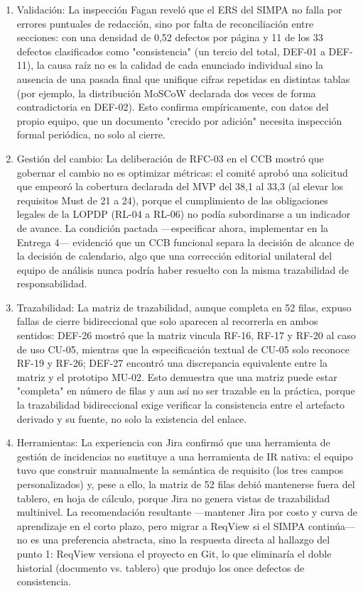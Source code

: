 \documentclass[11pt,letterpaper]{article}
\begin{document}
\begin{enumerate}[leftmargin=*]
  \item {Validación: La inspección Fagan reveló que el ERS del SIMPA no falla por errores puntuales de redacción, sino por falta de reconciliación entre secciones: con una densidad de 0,52 defectos por página y 11 de los 33 defectos clasificados como "consistencia" (un tercio del total, DEF-01 a DEF-11), la causa raíz no es la calidad de cada enunciado individual sino la ausencia de una pasada final que unifique cifras repetidas en distintas tablas (por ejemplo, la distribución MoSCoW declarada dos veces de forma contradictoria en DEF-02). Esto confirma empíricamente, con datos del propio equipo, que un documento "crecido por adición" necesita inspección formal periódica, no solo al cierre.}
  \item {Gestión del cambio: La deliberación de RFC-03 en el CCB mostró que gobernar el cambio no es optimizar métricas: el comité aprobó una solicitud que empeoró la cobertura declarada del MVP del 38,1 al 33,3 (al elevar los requisitos Must de 21 a 24), porque el cumplimiento de las obligaciones legales de la LOPDP (RL-04 a RL-06) no podía subordinarse a un indicador de avance. La condición pactada —especificar ahora, implementar en la Entrega 4— evidenció que un CCB funcional separa la decisión de alcance de la decisión de calendario, algo que una corrección editorial unilateral del equipo de análisis nunca podría haber resuelto con la misma trazabilidad de responsabilidad.}
  \item {Trazabilidad: La matriz de trazabilidad, aunque completa en 52 filas, expuso fallas de cierre bidireccional que solo aparecen al recorrerla en ambos sentidos: DEF-26 mostró que la matriz vincula RF-16, RF-17 y RF-20 al caso de uso CU-05, mientras que la especificación textual de CU-05 solo reconoce RF-19 y RF-26; DEF-27 encontró una discrepancia equivalente entre la matriz y el prototipo MU-02. Esto demuestra que una matriz puede estar "completa" en número de filas y aun así no ser trazable en la práctica, porque la trazabilidad bidireccional exige verificar la consistencia entre el artefacto derivado y su fuente, no solo la existencia del enlace.}
  \item {Herramientas: La experiencia con Jira confirmó que una herramienta de gestión de incidencias no sustituye a una herramienta de IR nativa: el equipo tuvo que construir manualmente la semántica de requisito (los tres campos personalizados) y, pese a ello, la matriz de 52 filas debió mantenerse fuera del tablero, en hoja de cálculo, porque Jira no genera vistas de trazabilidad multinivel. La recomendación resultante —mantener Jira por costo y curva de aprendizaje en el corto plazo, pero migrar a ReqView si el SIMPA continúa— no es una preferencia abstracta, sino la respuesta directa al hallazgo del punto 1: ReqView versiona el proyecto en Git, lo que eliminaría el doble historial (documento vs. tablero) que produjo los once defectos de consistencia.}

\end{enumerate}
\end{document}
